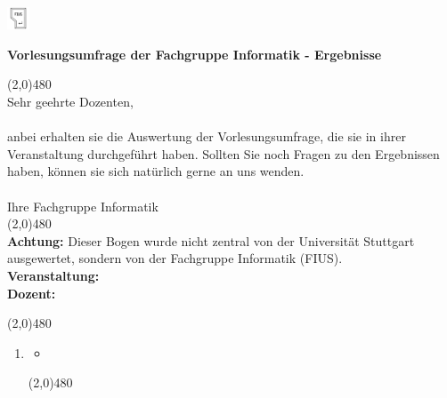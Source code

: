 \documentclass[10pt,a4paper]{article}
\author{Dominik Kesim, Magnus Specht, Sebastian Paule,}
\begin{document}
\begin{floatingfigure}[r]{0.03\textwidth}
\centering
\includegraphics[width=0.05\textwidth]{fius-logo.png}
\end{floatingfigure}
\vspace{-1cm}
\textbf{Vorlesungsumfrage der Fachgruppe Informatik - Ergebnisse}

\vspace{0.3cm}
\line(2,0){480} \\

Sehr geehrte Dozenten,\\
\\
anbei erhalten sie die Auswertung der Vorlesungsumfrage, die sie in ihrer Veranstaltung durchgeführt haben. Sollten Sie noch Fragen zu den Ergebnissen haben, können sie sich natürlich gerne an uns wenden.\\
\\
Ihre Fachgruppe Informatik\\

\vspace{2pt}
\line(2,0){480}
\vspace{2pt}\\

\textbf{Achtung:} Dieser Bogen wurde nicht zentral von der Universität Stuttgart ausgewertet, sondern von der Fachgruppe Informatik (FIUS).\\

\textbf{Veranstaltung:}\hspace{0.1cm}
\\
\textbf{Dozent:}\hspace{0.2cm}

\vspace{2pt}
\line(2,0){480}
\vspace{2pt}\\

\begin{enumerate}
	\item
	
    \begin{itemize}
    	\setlength\itemsep{1em}
    	\item[]
    \end{itemize}
	
	\vspace{2pt}
	\line(2,0){480}
	\vspace{2pt}\\
\end{enumerate}
\end{document}
